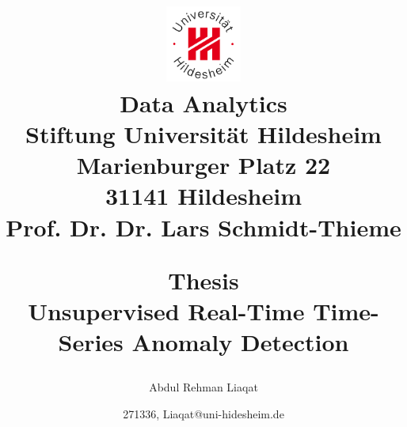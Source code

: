 \documentclass[12pt]{article}
\begin{document}
\title{
\begin{flushright}
\includegraphics[width=2.5cm]{logoUHi.jpg}\\
{\small
Data Analytics\\
Stiftung Universit{\"a}t Hildesheim\\
Marienburger Platz 22\\
31141 Hildesheim\\
Prof. Dr. Dr. Lars Schmidt-Thieme\\
}
\end{flushright}
\bigskip
\begin{center}
Thesis\\
Unsupervised Real-Time Time-Series Anomaly Detection\\
\end{center}
}
\author{Abdul Rehman Liaqat}
\date{271336, Liaqat@uni-hidesheim.de}
\maketitle

\newpage
\tableofcontents
\newpage
\listoffigures
\newpage
\listoftables
\newpage
\end{document}
